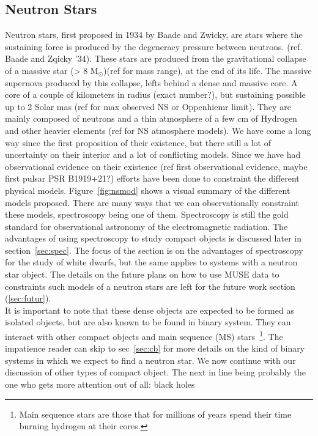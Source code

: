 \subsection{Neutron Stars}\label{sec:ns}

Neutron stars, first proposed in 1934 by Baade and Zwicky,  are stars where the sustaining force is produced by the degeneracy pressure between neutrons. (ref. Baade and Zqicky '34). These stars are produced from the gravitational collapse of a massive star (> 8 M$_\odot$)(ref for mass range), at the end of its life. The massive supernova produced by this collapse, lefts behind a dense and massive core. A core of a couple of kilometers in radius (exact number?), but sustaining possible up to 2 Solar mas (ref for max observed NS or Oppenhiemr limit). They are mainly  composed of neutrons and a thin atmosphere of a few cm of Hydrogen and other heavier elements (ref for NS atmosphere models). We have come a long way since the first proposition of their existence, but there still a lot of  uncertainty on their interior and a lot of conflicting models. Since we have had observational evidence on their existence (ref first observational evidence, maybe first pulsar PSR B1919+21?) efforts have been done to constraint the different physical models. Figure~\ref{fig:nsmod} shows a visual summary of the different models proposed. There are many ways that we can observationally constraint these models, spectroscopy being one of them. Spectroscopy is still the gold standard for observational astronomy of the electromagnetic radiation. The advantages of using spectroscopy to study compact objects is discussed later in section~\ref{sec:spec}. The focus of the section is on the advantages of spectroscopy for the study of white dwarfs, but the same applies to systems with a neutron star object. The details on the future plans on how to use MUSE data to constraints such models of a neutron stars are left for the future work section (\ref{sec:futur}).\\


It is important to note that these dense objects are expected to be formed as isolated objects, but are also known to be found in binary system. They can interact with other compact objects and main sequence (MS) stars~\footnote{Main sequence stars are those that for millions of years spend their time burning hydrogen at their cores.}. The impatience reader can skip to sec~\ref{sec:cb} for more details on the kind of binary systems in which we expect to find a neutron star. We now continue with our discussion of other types of compact object. The next in line being probably the one who gets more attention out of all: black holes



